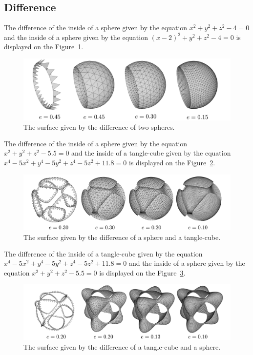 \subsection{Difference}

The difference of the inside of a sphere given by the equation
$x^2+y^2+z^2-4=0$ and the inside of a sphere given by the 
equation $(x-2)^2+y^2+z^2-4=0$ is displayed on the Figure~\ref{img:80}.
\begin{figure}[h!]
    \centerline{\includegraphics[scale=0.49]{images/img80}}
    \caption[The surface given by the difference of two spheres]
    {The surface given by the difference of two spheres.}
    \label{img:80}
\end{figure}

The difference of the inside of a sphere given by the equation
$x^2+y^2+z^2-5.5=0$ and the inside of a tangle-cube given by the 
equation $x^4-5x^2+y^4-5y^2+z^4-5z^2+11.8=0$ is displayed on the Figure~\ref{img:82}.
\begin{figure}[h!]
    \centerline{\includegraphics[scale=0.49]{images/img82}}
    \caption[The surface given by the difference of a sphere and a tangle-cube]
    {The surface given by the difference of a sphere and a tangle-cube.}
    \label{img:82}
\end{figure}

The difference of the inside of a tangle-cube given by the 
equation $x^4-5x^2+y^4-5y^2+z^4-5z^2+11.8=0$ and the inside 
of a sphere given by the equation
$x^2+y^2+z^2-5.5=0$ is displayed on the Figure~\ref{img:83}.
\begin{figure}[h!]
    \centerline{\includegraphics[scale=0.49]{images/img83}}
    \caption[The surface given by the difference of a tangle-cube and a sphere]
    {The surface given by the difference of a tangle-cube and a sphere.}
    \label{img:83}
\end{figure}

